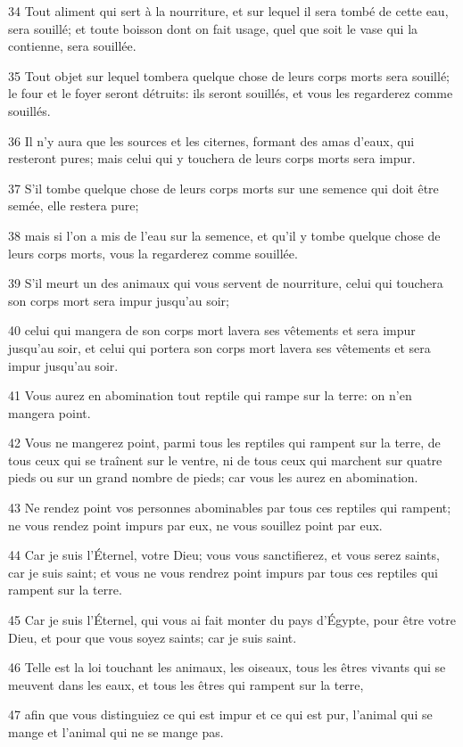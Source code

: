 \par 34 Tout aliment qui sert à la nourriture, et sur lequel il sera tombé de cette eau, sera souillé; et toute boisson dont on fait usage, quel que soit le vase qui la contienne, sera souillée.
\par 35 Tout objet sur lequel tombera quelque chose de leurs corps morts sera souillé; le four et le foyer seront détruits: ils seront souillés, et vous les regarderez comme souillés.
\par 36 Il n'y aura que les sources et les citernes, formant des amas d'eaux, qui resteront pures; mais celui qui y touchera de leurs corps morts sera impur.
\par 37 S'il tombe quelque chose de leurs corps morts sur une semence qui doit être semée, elle restera pure;
\par 38 mais si l'on a mis de l'eau sur la semence, et qu'il y tombe quelque chose de leurs corps morts, vous la regarderez comme souillée.
\par 39 S'il meurt un des animaux qui vous servent de nourriture, celui qui touchera son corps mort sera impur jusqu'au soir;
\par 40 celui qui mangera de son corps mort lavera ses vêtements et sera impur jusqu'au soir, et celui qui portera son corps mort lavera ses vêtements et sera impur jusqu'au soir.
\par 41 Vous aurez en abomination tout reptile qui rampe sur la terre: on n'en mangera point.
\par 42 Vous ne mangerez point, parmi tous les reptiles qui rampent sur la terre, de tous ceux qui se traînent sur le ventre, ni de tous ceux qui marchent sur quatre pieds ou sur un grand nombre de pieds; car vous les aurez en abomination.
\par 43 Ne rendez point vos personnes abominables par tous ces reptiles qui rampent; ne vous rendez point impurs par eux, ne vous souillez point par eux.
\par 44 Car je suis l'Éternel, votre Dieu; vous vous sanctifierez, et vous serez saints, car je suis saint; et vous ne vous rendrez point impurs par tous ces reptiles qui rampent sur la terre.
\par 45 Car je suis l'Éternel, qui vous ai fait monter du pays d'Égypte, pour être votre Dieu, et pour que vous soyez saints; car je suis saint.
\par 46 Telle est la loi touchant les animaux, les oiseaux, tous les êtres vivants qui se meuvent dans les eaux, et tous les êtres qui rampent sur la terre,
\par 47 afin que vous distinguiez ce qui est impur et ce qui est pur, l'animal qui se mange et l'animal qui ne se mange pas.

